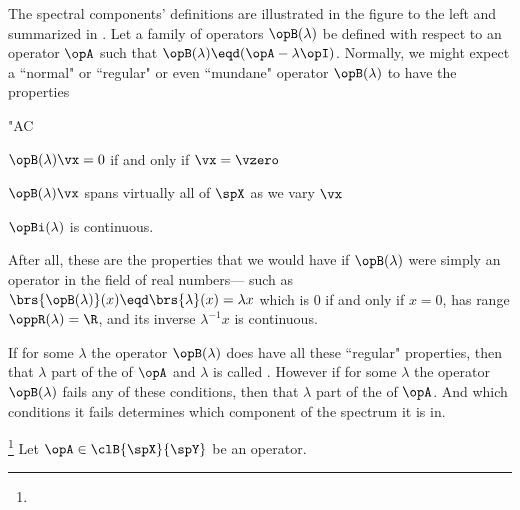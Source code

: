 \hfill
\begin{minipage}[c]{6\tw/16-1ex}
The spectral components' definitions are illustrated in the figure to the left and 
summarized in .
Let a family of operators $\opB(\lambda)$ be defined with respect to an operator $\opA$
such that $\opB(\lambda)\eqd(\opA-\lambda\opI)$.
Normally, we might expect a ``normal" or ``regular" or even ``mundane" operator 
$\opB(\lambda)$ to have the properties
  \begin{dingautolist}{"AC}
    \item $\opB(\lambda)\vx=0$ if and only if $\vx=\vzero$
    \item $\opB(\lambda)\vx$ spans virtually all of $\spX$ as we vary $\vx$
    \item $\opBi(\lambda)$ is continuous.
  \end{dingautolist}
\end{minipage}
After all, these are the properties that we would have if $\opB(\lambda)$ 
were simply an  operator in the field of real numbers---
such as $\brs{\opB(\lambda)}(x)\eqd \brs{\lambda}(x)=\lambda x$
which is $0$ if and only if $x=0$, has range $\oppR(\lambda)=\R$,
and its inverse $\lambda^{-1}x$ is continuous.

If for some $\lambda$ the operator $\opB(\lambda)$ 
does have all these ``regular" properties, 
then that $\lambda$ part of the  of $\opA$ and $\lambda$ is called
.
However if for some $\lambda$ the operator $\opB(\lambda)$ 
fails any of these conditions, then that $\lambda$ part of the  of $\opA$.
And which conditions it fails determines which component of the spectrum it is in.

\begin{theorem}
\footnote{
  }
Let $\opA\in\clB{\spX}{\spY}$ be an operator.
\thmbox{
  \oppSpec(\opA) = \oppSpecp(\opA) \setu \oppSpecc(\opA) \setu \oppSpecr(\opA)
  }
\end{theorem}





